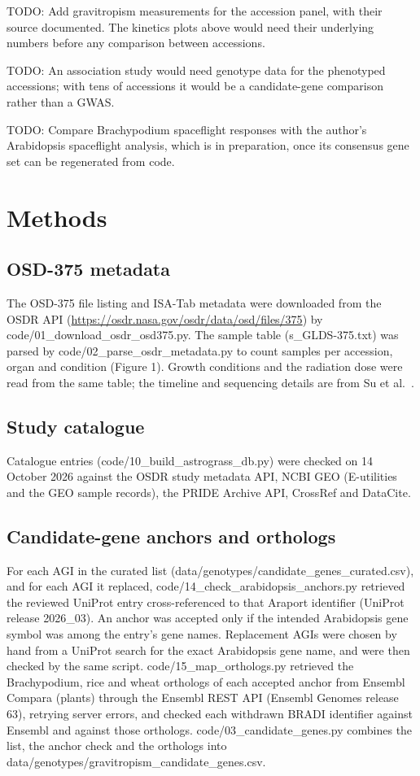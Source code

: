 \documentclass[sn-mathphys-num,Basic]{sn-jnl}
\begin{document}
TODO: Add gravitropism measurements for the accession panel, with their source documented. The kinetics plots above would need their underlying numbers before any comparison between accessions.

TODO: An association study would need genotype data for the phenotyped accessions; with tens of accessions it would be a candidate-gene comparison rather than a GWAS.

TODO: Compare Brachypodium spaceflight responses with the author's Arabidopsis spaceflight analysis, which is in preparation, once its consensus gene set can be regenerated from code.

\section{Methods}

\subsection{OSD-375 metadata}

The OSD-375 file listing and ISA-Tab metadata were downloaded from the OSDR API (\url{https://osdr.nasa.gov/osdr/data/osd/files/375}) by code/01\_download\_osdr\_osd375.py. The sample table (s\_GLDS-375.txt) was parsed by code/02\_parse\_osdr\_metadata.py to count samples per accession, organ and condition (Figure 1). Growth conditions and the radiation dose were read from the same table; the timeline and sequencing details are from Su et al.~\cite{Su2023}.

\subsection{Study catalogue}

Catalogue entries (code/10\_build\_astrograss\_db.py) were checked on 14 October 2026 against the OSDR study metadata API, NCBI GEO (E-utilities and the GEO sample records), the PRIDE Archive API, CrossRef and DataCite.

\subsection{Candidate-gene anchors and orthologs}

For each AGI in the curated list (data/genotypes/candidate\_genes\_curated.csv), and for each AGI it replaced, code/14\_check\_arabidopsis\_anchors.py retrieved the reviewed UniProt entry cross-referenced to that Araport identifier (UniProt release 2026\_03). An anchor was accepted only if the intended Arabidopsis gene symbol was among the entry's gene names. Replacement AGIs were chosen by hand from a UniProt search for the exact Arabidopsis gene name, and were then checked by the same script. code/15\_map\_orthologs.py retrieved the Brachypodium, rice and wheat orthologs of each accepted anchor from Ensembl Compara (plants) through the Ensembl REST API (Ensembl Genomes release 63), retrying server errors, and checked each withdrawn BRADI identifier against Ensembl and against those orthologs. code/03\_candidate\_genes.py combines the list, the anchor check and the orthologs into data/genotypes/gravitropism\_candidate\_genes.csv.
\end{document}
